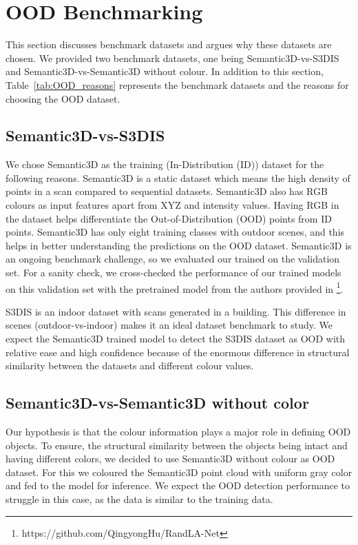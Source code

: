 \section{OOD Benchmarking}
This section discusses benchmark datasets and argues why these datasets are chosen.
We provided two benchmark datasets, one being Semantic3D-vs-S3DIS and Semantic3D-vs-Semantic3D without colour.
In addition to this section, Table~\ref{tab:OOD_reasons} represents the benchmark datasets and the reasons for choosing the OOD dataset.

\subsection{Semantic3D-vs-S3DIS}
We chose Semantic3D as the training (In-Distribution (ID)) dataset for the following reasons.
Semantic3D is a static dataset which means the high density of points in a scan compared to sequential datasets.
Semantic3D also has RGB colours as input features apart from XYZ and intensity values.
Having RGB in the dataset helps differentiate the Out-of-Distribution (OOD) points from ID points.
Semantic3D has only eight training classes with outdoor scenes, and this helps in better understanding the predictions on the OOD dataset.
Semantic3D is an ongoing benchmark challenge, so we evaluated our trained on the validation set.
For a sanity check, we cross-checked the performance of our trained models on this validation set with the pretrained model from the authors provided in \footnote[1]{https://github.com/QingyongHu/RandLA-Net}.

S3DIS is an indoor dataset with scans generated in a building.
This difference in scenes (outdoor-vs-indoor) makes it an ideal dataset benchmark to study.
We expect the Semantic3D trained model to detect the S3DIS dataset as OOD with relative ease and high confidence because of the enormous difference in structural similarity between the datasets and different colour values.

\subsection{Semantic3D-vs-Semantic3D without color}
Our hypothesis is that the colour information plays a major role in defining OOD objects.
To ensure, the structural similarity between the objects being intact and having different colors, we decided to use Semantic3D without colour as OOD dataset.
For this we coloured the Semantic3D point cloud with uniform gray color and fed to the model for inference.
We expect the OOD detection performance to struggle in this case, as the data is similar to the training data.


